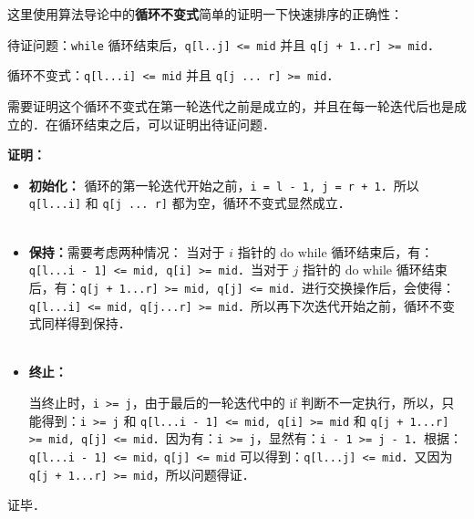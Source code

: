 这里使用算法导论中的\textbf{循环不变式}简单的证明一下快速排序的正确性：

待证问题：\verb|while| 循环结束后，\verb|q[l..j] <= mid| 并且 \verb|q[j + 1..r] >= mid|．

循环不变式：\verb|q[l...i] <= mid| 并且 \verb|q[j ... r] >= mid|．

需要证明这个循环不变式在第一轮迭代之前是成立的，并且在每一轮迭代后也是成立的．在循环结束之后，可以证明出待证问题．

\textbf{证明：}
\begin{itemize}
\item 

\textbf{初始化：} 循环的第一轮迭代开始之前，\verb|i = l - 1, j = r + 1|．所以 \verb|q[l...i]| 和 \verb|q[j ... r]| 都为空，循环不变式显然成立．\\\\

\item \textbf{保持：}需要考虑两种情况：
当对于 $i$ 指针的 $\text{do while}$ 循环结束后，有：\verb|q[l...i - 1] <= mid, q[i] >= mid|．当对于 $j$ 指针的 $\text{do while}$ 循环结束后，有：\verb|q[j + 1...r] >= mid, q[j] <= mid|．进行交换操作后，会使得：\verb|q[l...i] <= mid, q[j...r] >= mid|．所以再下次迭代开始之前，循环不变式同样得到保持．\\\\

\item \textbf{终止：}

当终止时，\verb|i >= j|，由于最后的一轮迭代中的 if 判断不一定执行，所以，只能得到：\verb|i >= j| 和 \verb|q[l...i - 1] <= mid, q[i] >= mid| 和 \verb|q[j + 1...r] >= mid, q[j] <= mid|．因为有：\verb|i >= j|，显然有：\verb|i - 1 >= j - 1|．根据：\verb|q[l...i - 1] <= mid，q[j] <= mid| 可以得到：\verb|q[l...j] <= mid|．又因为 \verb|q[j + 1...r] >= mid|，所以问题得证．

\end{itemize}

证毕．